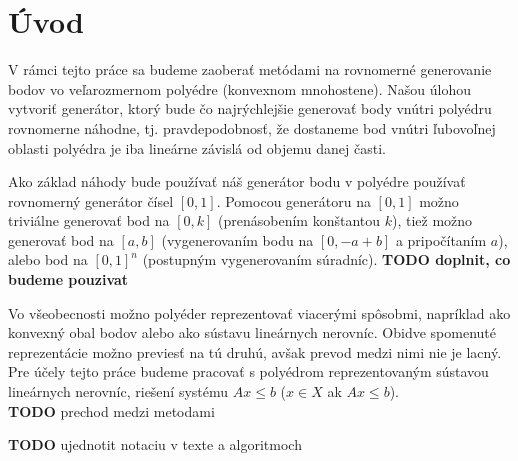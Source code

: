 \chapter*{Úvod} %

V rámci tejto práce sa budeme zaoberať metódami na rovnomerné generovanie bodov vo veľarozmernom polyédre (konvexnom mnohostene). Našou úlohou vytvoriť generátor, ktorý bude čo najrýchlejšie generovať body vnútri polyédru rovnomerne náhodne, tj. pravdepodobnosť, že dostaneme bod vnútri ľubovoľnej oblasti polyédra je iba lineárne závislá od objemu danej časti.

Ako základ náhody bude používať náš generátor bodu v polyédre používať rovnomerný generátor čísel $[0,1]$. Pomocou generátoru na $[0,1]$ možno triviálne generovať bod na $[0,k]$ (prenásobením konštantou $k$), tiež možno generovať bod na $[a,b]$ (vygenerovaním bodu na $[0, -a+b]$ a pripočítaním $a$), alebo bod na $[0,1]^n$ (postupným vygenerovaním súradníc). \textbf{TODO doplnit, co budeme pouzivat}

Vo všeobecnosti možno polyéder reprezentovať viacerými spôsobmi, napríklad ako konvexný obal bodov alebo ako sústavu lineárnych nerovníc. Obidve spomenuté reprezentácie možno previesť na tú druhú, avšak prevod medzi nimi nie je lacný. Pre účely tejto práce budeme pracovať s polyédrom reprezentovaným sústavou lineárnych nerovníc, riešení systému $Ax \leq b$ ($x \in X$ ak $Ax \leq b$).\\

\textbf{TODO} prechod medzi metodami

\textbf{TODO} ujednotit notaciu v texte a algoritmoch
